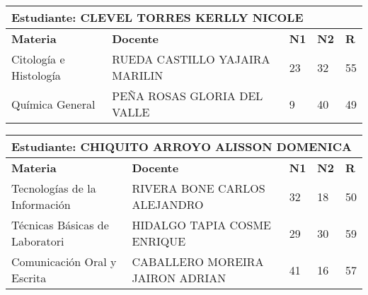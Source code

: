 \small
\begin{tabularx}{\textwidth}{|p{5cm}|p{7cm}|X|X|X|}
\hline
\multicolumn{5}{|p{\dimexpr\textwidth-2\tabcolsep-2\arrayrulewidth}|}{\textbf{Estudiante: CLEVEL TORRES KERLLY NICOLE }}\\\hline
\textbf{Materia} & \textbf{Docente} & \textbf{N1} & \textbf{N2} & \textbf{R} \\ \hline
Citología e Histología & RUEDA CASTILLO YAJAIRA MARILIN  & 23 & 32& 55 \\ \hline
Química General & PEÑA ROSAS GLORIA DEL VALLE  & 9 & 40& 49 \\ \hline
\end{tabularx}\vspace{10mm}
\small
\begin{tabularx}{\textwidth}{|p{5cm}|p{7cm}|X|X|X|}
\hline
\multicolumn{5}{|p{\dimexpr\textwidth-2\tabcolsep-2\arrayrulewidth}|}{\textbf{Estudiante: CHIQUITO ARROYO ALISSON DOMENICA }}\\\hline
\textbf{Materia} & \textbf{Docente} & \textbf{N1} & \textbf{N2} & \textbf{R} \\ \hline
Tecnologías de la Información  & RIVERA BONE CARLOS ALEJANDRO  & 32 & 18& 50 \\ \hline
Técnicas Básicas de Laboratori & HIDALGO TAPIA COSME ENRIQUE  & 29 & 30& 59 \\ \hline
Comunicación Oral y Escrita & CABALLERO MOREIRA JAIRON ADRIAN  & 41 & 16& 57 \\ \hline
\end{tabularx}\vspace{10mm}
